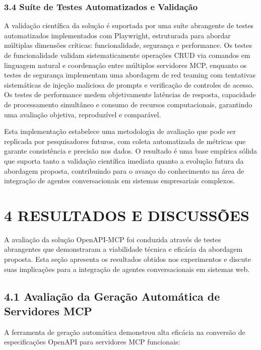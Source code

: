 \documentclass[
]{article}
\begin{document}
\subsubsection{3.4 Suíte de Testes Automatizados e
Validação}\label{suuxedte-de-testes-automatizados-e-validauxe7uxe3o}

A validação científica da solução é suportada por uma suíte abrangente
de testes automatizados implementados com Playwright, estruturada para
abordar múltiplas dimensões críticas: funcionalidade, segurança e
performance. Os testes de funcionalidade validam sistematicamente
operações CRUD via comandos em linguagem natural e coordenação entre
múltiplos servidores MCP, enquanto os testes de segurança implementam
uma abordagem de red teaming com tentativas sistemáticas de injeção
maliciosa de prompts e verificação de controles de acesso. Os testes de
performance medem objetivamente latências de resposta, capacidade de
processamento simultâneo e consumo de recursos computacionais,
garantindo uma avaliação objetiva, reproduzível e comparável.

Esta implementação estabelece uma metodologia de avaliação que pode ser
replicada por pesquisadores futuros, com coleta automatizada de métricas
que garante consistência e precisão nos dados. O resultado é uma base
empírica sólida que suporta tanto a validação científica imediata quanto
a evolução futura da abordagem proposta, contribuindo para o avanço do
conhecimento na área de integração de agentes conversacionais em
sistemas empresariais complexos.

\section{4 RESULTADOS E DISCUSSÕES}\label{resultados-e-discussuxf5es}

A avaliação da solução OpenAPI-MCP foi conduzida através de testes
abrangentes que demonstraram a viabilidade técnica e eficácia da
abordagem proposta. Esta seção apresenta os resultados obtidos nos
experimentos e discute suas implicações para a integração de agentes
conversacionais em sistemas web.

\subsection{4.1 Avaliação da Geração Automática de Servidores
MCP}\label{avaliauxe7uxe3o-da-gerauxe7uxe3o-automuxe1tica-de-servidores-mcp}

A ferramenta de geração automática demonstrou alta eficácia na conversão
de especificações OpenAPI para servidores MCP funcionais:
\end{document}
